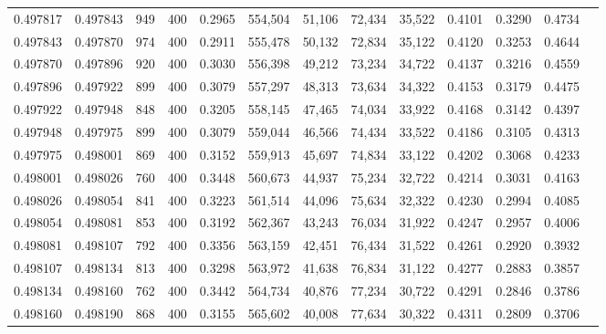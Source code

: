 \begin{tabular}{rrrrrrrrrrrrr}
0.497817 & 0.497843 &    949 & 400 &                                     0.2965 & 554,504 &  51,106 &  72,434 &  35,522 & 0.4101 & 0.3290 & 0.4734 \\
0.497843 & 0.497870 &    974 & 400 &                                     0.2911 & 555,478 &  50,132 &  72,834 &  35,122 & 0.4120 & 0.3253 & 0.4644 \\
0.497870 & 0.497896 &    920 & 400 &                                     0.3030 & 556,398 &  49,212 &  73,234 &  34,722 & 0.4137 & 0.3216 & 0.4559 \\
0.497896 & 0.497922 &    899 & 400 &                                     0.3079 & 557,297 &  48,313 &  73,634 &  34,322 & 0.4153 & 0.3179 & 0.4475 \\
0.497922 & 0.497948 &    848 & 400 &                                     0.3205 & 558,145 &  47,465 &  74,034 &  33,922 & 0.4168 & 0.3142 & 0.4397 \\
0.497948 & 0.497975 &    899 & 400 &                                     0.3079 & 559,044 &  46,566 &  74,434 &  33,522 & 0.4186 & 0.3105 & 0.4313 \\
0.497975 & 0.498001 &    869 & 400 &                                     0.3152 & 559,913 &  45,697 &  74,834 &  33,122 & 0.4202 & 0.3068 & 0.4233 \\
0.498001 & 0.498026 &    760 & 400 &                                     0.3448 & 560,673 &  44,937 &  75,234 &  32,722 & 0.4214 & 0.3031 & 0.4163 \\
0.498026 & 0.498054 &    841 & 400 &                                     0.3223 & 561,514 &  44,096 &  75,634 &  32,322 & 0.4230 & 0.2994 & 0.4085 \\
0.498054 & 0.498081 &    853 & 400 &                                     0.3192 & 562,367 &  43,243 &  76,034 &  31,922 & 0.4247 & 0.2957 & 0.4006 \\
0.498081 & 0.498107 &    792 & 400 &                                     0.3356 & 563,159 &  42,451 &  76,434 &  31,522 & 0.4261 & 0.2920 & 0.3932 \\
0.498107 & 0.498134 &    813 & 400 &                                     0.3298 & 563,972 &  41,638 &  76,834 &  31,122 & 0.4277 & 0.2883 & 0.3857 \\
0.498134 & 0.498160 &    762 & 400 &                                     0.3442 & 564,734 &  40,876 &  77,234 &  30,722 & 0.4291 & 0.2846 & 0.3786 \\
0.498160 & 0.498190 &    868 & 400 &                                     0.3155 & 565,602 &  40,008 &  77,634 &  30,322 & 0.4311 & 0.2809 & 0.3706 \\

\end{tabular}
